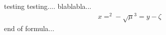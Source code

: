 \documentclass{article}
\begin{document}
   testing testing.... blablabla...
   \begin{eqnarray}
   x=^2-\sqrt{\mu}^3=y-\zeta
   \nonumber
   \end{eqnarray}
   end of formula...
\end{document}
